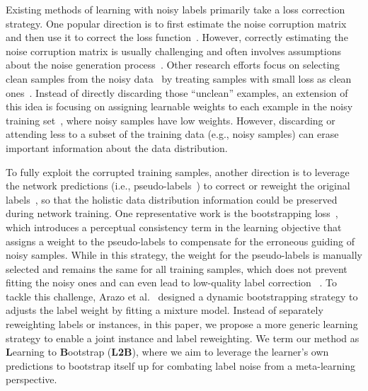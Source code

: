 \documentclass{article}
\begin{document}
Existing methods of learning with noisy labels primarily take a loss correction strategy.
One popular direction is to first estimate the noise corruption matrix and then use it to correct the loss function~\cite{patrini2017making,goldberger2017training}.
However, correctly estimating the noise corruption matrix is usually challenging and often involves assumptions about the noise generation process~\cite{xia2019anchor,liu2015classification,hendrycks2018using}. 
Other research efforts focus on selecting clean samples from the noisy data~\cite{jiang2018mentornet,han2018co,yu2019does,fang2020rethinking} by treating samples with small loss as clean ones~\cite{arpit2017closer}. 
Instead of directly discarding those ``unclean'' examples, an extension of this idea is focusing on assigning learnable weights to each example in the noisy training set~\cite{ren2018learning,shu2019meta}, where noisy samples have low weights. 
However, discarding or attending less to a subset of the training data (e.g., noisy samples) can erase important information about the data distribution.

To fully exploit the corrupted training samples, another direction is to leverage the network predictions (i.e., pseudo-labels~\cite{lee2013pseudo}) to correct or reweight the original labels~\cite{reed2014training,tanaka2018joint}, so that the holistic data distribution information could be preserved during network training.
One representative work is the bootstrapping loss~\cite{reed2014training}, 
which introduces a perceptual consistency term in the learning
objective that assigns a weight to the pseudo-labels to compensate for the erroneous guiding of noisy
samples.
While in this strategy, the weight for the pseudo-labels is manually selected and remains the same for all training samples, which does not prevent fitting the noisy ones and can even lead to low-quality label correction ~\cite{arazo2019unsupervised}. 
To tackle this challenge, Arazo et al.~\cite{arazo2019unsupervised} designed a dynamic bootstrapping strategy to adjusts the label weight by fitting a mixture model. 
Instead of separately reweighting labels or instances, in this paper, we propose a more generic learning strategy to enable a joint instance and label reweighting.
We term our method as \textbf{L}earning to \textbf{B}ootstrap (\textbf{L2B}), where we aim to leverage the learner's own predictions to bootstrap itself up for combating label noise from a meta-learning perspective.
\end{document}
